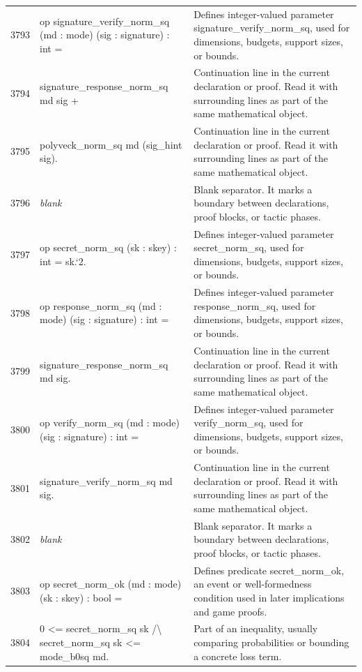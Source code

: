 \documentclass[10pt]{article}
\begin{document}
\begin{longtable}{r L{0.53\textwidth} L{0.37\textwidth}}
3793 & {\ttfamily\scriptsize op signature\_verify\_norm\_sq (md : mode) (sig : signature) : int =} & Defines integer-valued parameter signature\_verify\_norm\_sq, used for dimensions, budgets, support sizes, or bounds. \\
3794 & {\ttfamily\scriptsize   signature\_response\_norm\_sq md sig +} & Continuation line in the current declaration or proof.  Read it with surrounding lines as part of the same mathematical object. \\
3795 & {\ttfamily\scriptsize   polyveck\_norm\_sq md (sig\_hint sig).} & Continuation line in the current declaration or proof.  Read it with surrounding lines as part of the same mathematical object. \\
3796 & {\ttfamily\scriptsize \emph{blank}} & Blank separator.  It marks a boundary between declarations, proof blocks, or tactic phases. \\
3797 & {\ttfamily\scriptsize op secret\_norm\_sq (sk : skey) : int = sk.`2.} & Defines integer-valued parameter secret\_norm\_sq, used for dimensions, budgets, support sizes, or bounds. \\
3798 & {\ttfamily\scriptsize op response\_norm\_sq (md : mode) (sig : signature) : int =} & Defines integer-valued parameter response\_norm\_sq, used for dimensions, budgets, support sizes, or bounds. \\
3799 & {\ttfamily\scriptsize   signature\_response\_norm\_sq md sig.} & Continuation line in the current declaration or proof.  Read it with surrounding lines as part of the same mathematical object. \\
3800 & {\ttfamily\scriptsize op verify\_norm\_sq (md : mode) (sig : signature) : int =} & Defines integer-valued parameter verify\_norm\_sq, used for dimensions, budgets, support sizes, or bounds. \\
3801 & {\ttfamily\scriptsize   signature\_verify\_norm\_sq md sig.} & Continuation line in the current declaration or proof.  Read it with surrounding lines as part of the same mathematical object. \\
3802 & {\ttfamily\scriptsize \emph{blank}} & Blank separator.  It marks a boundary between declarations, proof blocks, or tactic phases. \\
3803 & {\ttfamily\scriptsize op secret\_norm\_ok (md : mode) (sk : skey) : bool =} & Defines predicate secret\_norm\_ok, an event or well-formedness condition used in later implications and game proofs. \\
3804 & {\ttfamily\scriptsize   0 <= secret\_norm\_sq sk /\textbackslash{} secret\_norm\_sq sk <= mode\_b0sq md.} & Part of an inequality, usually comparing probabilities or bounding a concrete loss term. \\

\end{longtable}
\end{document}
